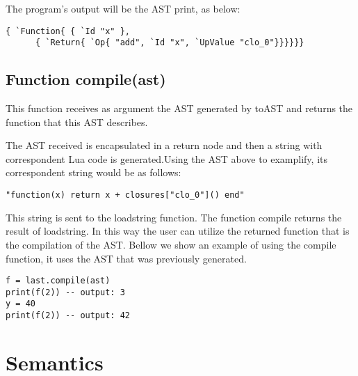\documentclass[english]{llncs}
\begin{document}
The program's output will be the AST print, as below:
\begin{verbatim}
{ `Function{ { `Id "x" },
      { `Return{ `Op{ "add", `Id "x", `UpValue "clo_0"}}}}}}
\end{verbatim}


\subsection{Function compile(ast) }


This function receives as argument the AST generated by toAST and returns the function that this AST describes.

The AST received is encapsulated in a return node and then a string with correspondent Lua code is generated.Using the AST above to examplify, its correspondent string would be as follows:


\begin{verbatim}
"function(x) return x + closures["clo_0"]() end"
\end{verbatim}

This string is sent to the loadstring function.
The function compile returns the result of loadstring.
In this way the user can utilize the returned function that is the compilation of the AST.
Bellow we show an example of using the compile function, it uses the AST that was previously generated.


\begin{verbatim}
f = last.compile(ast)
print(f(2)) -- output: 3
y = 40
print(f(2)) -- output: 42
\end{verbatim}



\section{Semantics}

\label{sec:evaluation_semantics}

\end{document}

